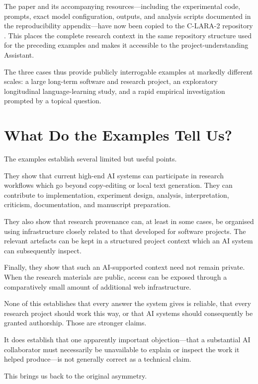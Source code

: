 \documentclass[12pt]{article}
\begin{document}
The paper and its accompanying resources---including the experimental code, prompts, exact model configuration, outputs, and analysis scripts documented in the reproducibility appendix---have now been copied to the C-LARA-2 repository \citep[Appendix~A]{raynerChatGPT2025grok}. This places the complete research context in the same repository structure used for the preceding examples and makes it accessible to the project-understanding Assistant.

The three cases thus provide publicly interrogable examples at markedly different scales: a large long-term software and research project, an exploratory longitudinal language-learning study, and a rapid empirical investigation prompted by a topical question.


\section{What Do the Examples Tell Us?}

The examples establish several limited but useful points.

They show that current high-end AI systems can participate in research workflows which go beyond copy-editing or local text generation. They can contribute to implementation, experiment design, analysis, interpretation, criticism, documentation, and manuscript preparation.

They also show that research provenance can, at least in some cases, be organised using infrastructure closely related to that developed for software projects. The relevant artefacts can be kept in a structured project context which an AI system can subsequently inspect.

Finally, they show that such an AI-supported context need not remain private. When the research materials are public, access can be exposed through a comparatively small amount of additional web infrastructure.

None of this establishes that every answer the system gives is reliable, that every research project should work this way, or that AI systems should consequently be granted authorship. Those are stronger claims.

It does establish that one apparently important objection---that a substantial AI collaborator must necessarily be unavailable to explain or inspect the work it helped produce---is not generally correct as a technical claim.

This brings us back to the original asymmetry.
\end{document}
